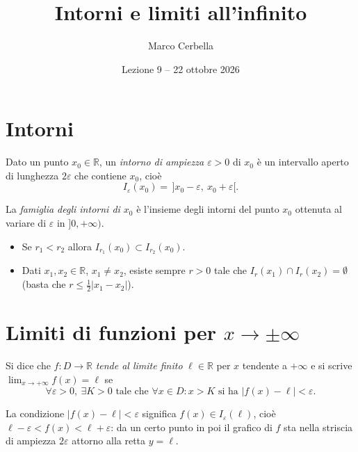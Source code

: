 \documentclass[11pt,a4paper]{article}
\title{Intorni e limiti all'infinito}
\author{Marco Cerbella}
\date{Lezione 9 -- 22 ottobre 2026}
\begin{document}
\maketitle

\section{Intorni}

\begin{definizione}[Intorno]
Dato un punto $x_0 \in \mathbb{R}$, un \emph{intorno di ampiezza $\varepsilon > 0$} di $x_0$ è un intervallo aperto di lunghezza $2\varepsilon$ che contiene $x_0$, cioè
\[
I_\varepsilon(x_0) = \,]x_0 - \varepsilon,\ x_0 + \varepsilon[ .
\]
\end{definizione}

La \emph{famiglia degli intorni di $x_0$} è l'insieme degli intorni del punto $x_0$ ottenuta al variare di $\varepsilon$ in $]0, +\infty)$.

\begin{proprieta}
\begin{itemize}
    \item Se $r_1 < r_2$ allora $I_{r_1}(x_0) \subset I_{r_2}(x_0)$.
    \item Dati $x_1, x_2 \in \mathbb{R}$, $x_1 \neq x_2$, esiste sempre $r > 0$ tale che $I_r(x_1) \cap I_r(x_2) = \emptyset$ (basta che $r \le \tfrac{1}{2}|x_1 - x_2|$).
\end{itemize}
\end{proprieta}

\section{Limiti di funzioni per $x \to \pm\infty$}

\begin{definizione}
Si dice che $f : D \to \mathbb{R}$ \emph{tende al limite finito} $\ell \in \mathbb{R}$ per $x$ tendente a $+\infty$ e si scrive $\displaystyle\lim_{x \to +\infty} f(x) = \ell$ se
\[
\forall \varepsilon > 0,\ \exists K > 0 \text{ tale che } \forall x \in D : x > K \text{ si ha } |f(x) - \ell| < \varepsilon .
\]
\end{definizione}

La condizione $|f(x) - \ell| < \varepsilon$ significa $f(x) \in I_\varepsilon(\ell)$, cioè $\ell - \varepsilon < f(x) < \ell + \varepsilon$: da un certo punto in poi il grafico di $f$ sta nella striscia di ampiezza $2\varepsilon$ attorno alla retta $y = \ell$.
\end{document}
